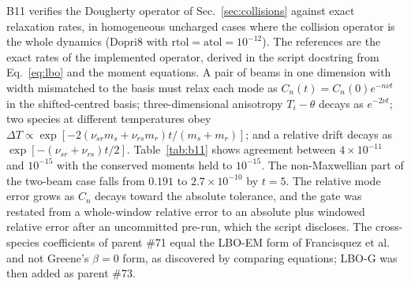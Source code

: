 B11 verifies the Dougherty operator of Sec.~\ref{sec:collisions} against exact relaxation rates, in homogeneous uncharged cases where the collision operator is the whole dynamics (Dopri8 with $\mathrm{rtol}=\mathrm{atol}=10^{-12}$). The references are the exact rates of the implemented operator, derived in the script docstring from Eq.~\eqref{eq:lbo} and the moment equations. A pair of beams in one dimension with width mismatched to the basis must relax each mode as $C_n(t)=C_n(0)e^{-n\nu t}$ in the shifted-centred basis; three-dimensional anisotropy $T_i-\theta$ decays as $e^{-2\nu t}$; two species at different temperatures obey $\Delta T\propto\exp[-2(\nu_{sr}m_s+\nu_{rs}m_r)t/(m_s+m_r)]$; and a relative drift decays as $\exp[-(\nu_{sr}+\nu_{rs})t/2]$. Table~\ref{tab:b11} shows agreement between $4\times10^{-11}$ and $10^{-15}$ with the conserved moments held to $10^{-15}$. The non-Maxwellian part of the two-beam case falls from $0.191$ to $2.7\times10^{-10}$ by $t=5$. The relative mode error grows as $C_n$ decays toward the absolute tolerance, and the gate was restated from a whole-window relative error to an absolute plus windowed relative error after an uncommitted pre-run, which the script discloses. The cross-species coefficients of parent \#71 equal the LBO-EM form of Francisquez et al.~\cite{Francisquez2022} and not Greene's $\beta=0$ form, as discovered by comparing equations; LBO-G was then added as parent \#73.

\begin{table}[t]
\caption{B11: Dougherty relaxation against exact rates (homogeneous, uncharged).}\label{tab:b11}
\small
{}
\end{table}

